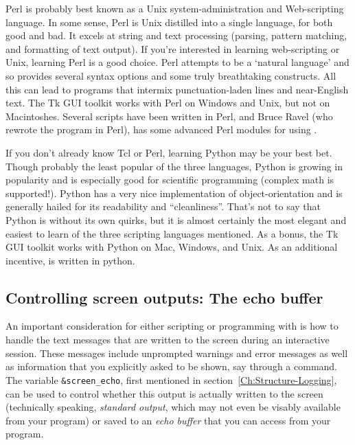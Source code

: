 {}
Perl\cite{LearningPerl,CamelBook} is probably best known as a Unix
system-administration and Web-scripting language.  In some sense, Perl is
Unix distilled into a single language, for both good and bad.  It excels at
string and text processing (parsing, pattern matching, and formatting of
text output).  If you're interested in learning web-scripting or Unix,
learning Perl is a good choice.  Perl attempts to be a `natural language'
and so provides several syntax options and some truly breathtaking
constructs.  All this can lead to programs that intermix punctuation-laden
lines and near-English text.  The Tk GUI toolkit works with Perl on Windows
and Unix, but not on Macintoshes.  Several {\ifeffit} scripts have been
written in Perl, and Bruce Ravel (who rewrote the {\atoms} program in
Perl), has some advanced Perl modules for using {\ifeffit}.

{}
If you don't already know Tcl or Perl, learning Python\cite{LearningPython}
may be your best bet.  Though probably the least popular of the three
languages, Python is growing in popularity and is especially good for
scientific programming (complex math is supported!).  Python has a very
nice implementation of object-orientation and is generally hailed for its
readability and ``cleanliness''.  That's not to say that Python is without
its own quirks, but it is almost certainly the most elegant and easiest to
learn of the three scripting languages mentioned.  As a bonus, the Tk GUI
toolkit works with Python on Mac, Windows, and Unix.  As an additional
incentive, {\gifeffit} is written in python.


\subsection{Controlling screen outputs: The echo buffer}\label{Ch:Scripting-echo}

{}
An important consideration for either scripting or programming with
{\ifeffit} is how to handle the text messages that are written to the
screen during an interactive session.  These messages include unprompted
warnings and error messages as well as information that you explicitly
asked to be shown, say through a {} command.  The variable
{\tt{\&screen\_echo}}, first mentioned in
section~\ref{Ch:Structure-Logging}, can be used to control whether this
output is actually written to the screen (technically speaking,
{\emph{standard output}}, which may not even be visably available from your
program) or saved to an {\emph{echo buffer}} that you can access from your
program.  {}

